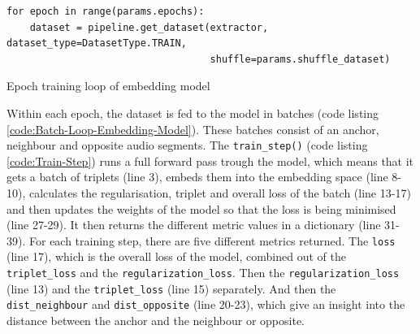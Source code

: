 \begin{code}[H]
\begin{verbatim}
for epoch in range(params.epochs):
    dataset = pipeline.get_dataset(extractor, dataset_type=DatasetType.TRAIN,
                                   shuffle=params.shuffle_dataset)
\end{verbatim}
\caption{Epoch training loop of embedding model}
\label{code:Epoch-Loop-Embedding-Model}
\end{code}
\noindent
Within each epoch, the dataset is fed to the model in batches (code listing \ref{code:Batch-Loop-Embedding-Model}). These batches consist of an anchor, neighbour and opposite audio segments. The \texttt{train\_step()} (code listing \ref{code:Train-Step}) runs a full forward pass trough the model, which means that it gets a batch of triplets (line 3), embeds them into the embedding space (line 8-10), calculates the regularisation, triplet and overall loss of the batch (line 13-17) and then updates the weights of the model so that the loss is being minimised (line 27-29). It then returns the different metric values in a dictionary (line 31-39). For each training step, there are five different metrics returned. The \texttt{loss} (line 17), which is the overall loss of the model, combined out of the \texttt{triplet\_loss} and the \texttt{regularization\_loss}. Then the \texttt{regularization\_loss} (line 13) and the \texttt{triplet\_loss} (line 15) separately. And then the \texttt{dist\_neighbour} and \texttt{dist\_opposite} (line 20-23), which give an insight into the distance between the anchor and the neighbour or opposite.

